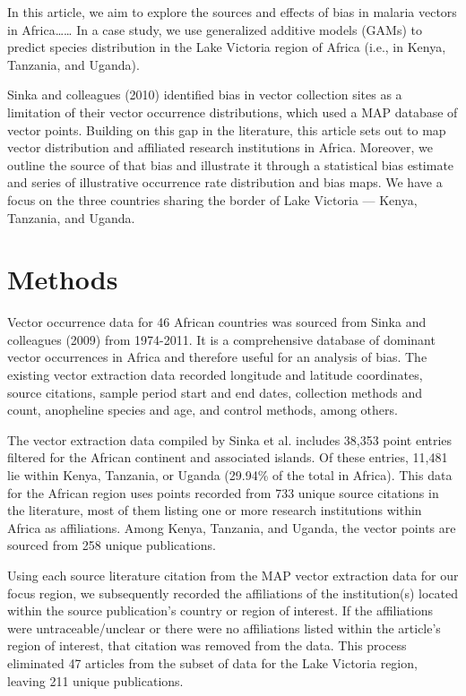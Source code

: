 \documentclass[sn-nature]{sn-jnl}%
\begin{document}
In this article, we aim to explore the sources and effects of bias in malaria vectors in Africa…… In a case study, we use generalized additive models (GAMs) to predict species distribution in the Lake Victoria region of Africa (i.e., in Kenya, Tanzania, and Uganda).

Sinka and colleagues (2010) identified bias in vector collection sites as a limitation of their vector occurrence distributions, which used a MAP database of vector points. Building on this gap in the literature, this article sets out to map vector distribution and affiliated research institutions in Africa. Moreover, we outline the source of that bias and illustrate it through a statistical bias estimate and series of illustrative occurrence rate distribution and bias maps. We have a focus on the three countries sharing the border of Lake Victoria --- Kenya, Tanzania, and Uganda.

\section*{Methods}\label{methods}
Vector occurrence data for 46 African countries was sourced from Sinka and colleagues (2009) from 1974-2011. It is a comprehensive database of dominant vector occurrences in Africa and therefore useful for an analysis of bias. The existing vector extraction data recorded longitude and latitude coordinates, source citations, sample period start and end dates, collection methods and count, anopheline species and age, and control methods, among others. 

The vector extraction data compiled by Sinka et al. includes 38,353 point entries filtered for the African continent and associated islands. Of these entries, 11,481 lie within Kenya, Tanzania, or Uganda (29.94\% of the total in Africa). This data for the African region uses points recorded from 733 unique source citations in the literature, most of them listing one or more research institutions within Africa as affiliations. Among Kenya, Tanzania, and Uganda, the vector points are sourced from 258 unique publications.

Using each source literature citation from the MAP vector extraction data for our focus region, we subsequently recorded the affiliations of the institution(s) located within the source publication’s country or region of interest. If the affiliations were untraceable/unclear or there were no affiliations listed within the article’s region of interest, that citation was removed from the data. This process eliminated 47 articles from the subset of data for the Lake Victoria region, leaving 211 unique publications. 
\end{document}
